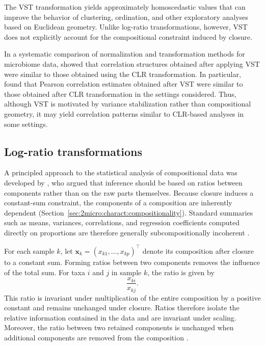 The VST transformation yields approximately homoscedastic values that can improve the behavior of clustering, ordination, and other exploratory analyses based on Euclidean geometry.
Unlike log-ratio transformations, however, VST does not explicitly account for the compositional constraint induced by closure.

In a systematic comparison of normalization and transformation methods for microbiome data, \citet{badri2020shrinkage} showed that correlation structures obtained after applying VST were similar to those obtained using the CLR transformation. 
In particular, \citet{badri2020shrinkage} found that Pearson correlation estimates obtained after VST were similar to those obtained after CLR transformation in the settings considered.
Thus, although VST is motivated by variance stabilization rather than compositional geometry, it may yield correlation patterns similar to CLR-based analyses in some settings.

\subsection{Log-ratio transformations}
\label{sec:2micro:norm:log-ratios}

A principled approach to the statistical analysis of compositional data was developed by \citet{aitchison1982statistical}, who argued that inference should be based on ratios between components rather than on the raw parts themselves. 
Because closure induces a constant-sum constraint, the components of a composition are inherently dependent (Section~\ref{sec:2micro:charact:compositionality}). 
Standard summaries such as means, variances, correlations, and regression coefficients computed directly on proportions are therefore generally subcompositionally incoherent \citep{aitchison1982statistical,aitchison1986statistical}. 

For each sample $k$, let
$\mathbf{x}_k = (x_{k1}, \dots, x_{kp})^\top$
denote its composition after closure to a constant sum. 
Forming ratios between two components removes the influence of the total sum. 
For taxa $i$ and $j$ in sample $k$, the ratio is given by
\begin{equation}
\frac{x_{ki}}{x_{kj}}.
\end{equation}
This ratio is invariant under multiplication of the entire composition by a positive constant and remains unchanged under closure. 
Ratios therefore isolate the relative information contained in the data and are invariant under scaling. Moreover, the ratio between two retained components is unchanged when additional components are removed from the composition  \citep{aitchison1982statistical,greenacre2021compositional}.

